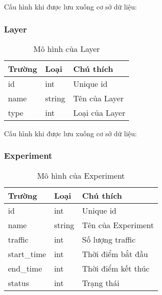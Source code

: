 Cấu hình khi được lưu xuống cơ sở dữ liệu:

\begin{itemize}
\end{itemize}

\subsubsection{Layer}

\begin{table}[H]
	\centering
	\begin{tabular}{|l|l|l|}
		\hline
		Trường & Loại   & Chú thích      \\ \hline
		id     & int    & Unique id      \\ \hline
		name   & string & Tên của Layer  \\ \hline
		type   & int    & Loại của Layer \\ \hline
	\end{tabular}
	\caption{Mô hình của Layer}
\end{table}

Cấu hình khi được lưu xuống cơ sở dữ liệu:

\begin{itemize}
\end{itemize}

\subsubsection{Experiment}

\begin{table}[H]
	\centering
	\begin{tabular}{|l|l|l|}
		\hline
		Trường      & Loại   & Chú thích          \\ \hline
		id          & int    & Unique id          \\ \hline
		name        & string & Tên của Experiment \\ \hline
		traffic     & int    & Số lượng traffic   \\ \hline
		start\_time & int    & Thời điểm bắt đầu  \\ \hline
		end\_time   & int    & Thời điểm kết thúc \\ \hline
		status      & int    & Trạng thái         \\ \hline
	\end{tabular}
	\caption{Mô hình của Experiment}
\end{table}

